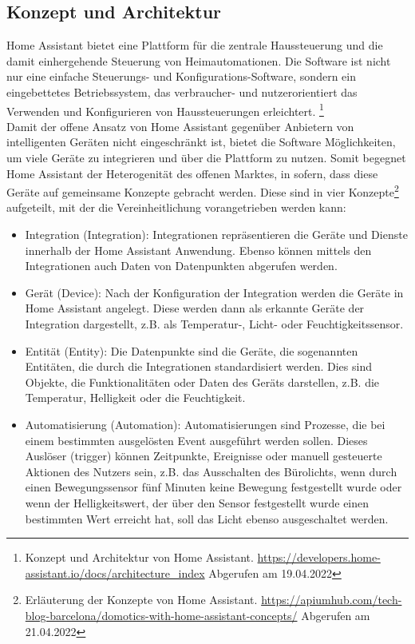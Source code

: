 \subsection{Konzept und Architektur}
\label{sec:conceptArchitectureHAOS}
    Home Assistant bietet eine Plattform für die zentrale Haussteuerung und die damit einhergehende Steuerung von Heimautomationen. Die 
    Software ist nicht nur eine einfache Steuerungs- und Konfigurations-Software, sondern ein eingebettetes Betriebssystem, das 
    verbraucher- und nutzerorientiert das Verwenden und Konfigurieren von Haussteuerungen erleichtert. \footnote{Konzept und Architektur von Home Assistant. \url{https://developers.home-assistant.io/docs/architecture_index} Abgerufen am 19.04.2022}
    \\
    \linebreak
    Damit der offene Ansatz von Home Assistant gegenüber Anbietern von intelligenten Geräten nicht eingeschränkt ist, bietet die Software Möglichkeiten, um viele 
    Geräte zu integrieren und über die Plattform zu nutzen. Somit begegnet Home Assistant der Heterogenität des offenen Marktes, in sofern, dass diese Geräte auf  
    gemeinsame Konzepte gebracht werden. Diese sind in vier Konzepte\footnote{Erläuterung der Konzepte von Home Assistant. \url{https://apiumhub.com/tech-blog-barcelona/domotics-with-home-assistant-concepts/} Abgerufen am 21.04.2022} 
    aufgeteilt, mit der die Vereinheitlichung vorangetrieben werden kann: 
    \begin{itemize}
        \item Integration (Integration): Integrationen repräsentieren die Geräte und Dienste innerhalb der Home Assistant Anwendung. 
              Ebenso können mittels den Integrationen auch Daten von Datenpunkten abgerufen werden.
        \item Gerät (Device): Nach der Konfiguration der Integration werden die Geräte in Home Assistant angelegt. 
              Diese werden dann als erkannte Geräte der Integration dargestellt, z.B. als Temperatur-, Licht- oder Feuchtigkeitssensor.
        \item Entität (Entity): Die Datenpunkte sind die Geräte, die sogenannten Entitäten, die durch die Integrationen standardisiert werden. 
              Dies sind Objekte, die Funktionalitäten oder Daten des Geräts darstellen, z.B. die Temperatur, Helligkeit oder die Feuchtigkeit.
        \item Automatisierung (Automation): Automatisierungen sind Prozesse, die bei einem bestimmten ausgelösten Event ausgeführt werden 
              sollen. Dieses Auslöser (trigger) können Zeitpunkte, Ereignisse oder manuell gesteuerte Aktionen des Nutzers sein, z.B. das 
              Ausschalten des Bürolichts, wenn durch einen Bewegungssensor fünf Minuten keine Bewegung festgestellt wurde oder wenn der 
              Helligkeitswert, der über den Sensor festgestellt wurde einen bestimmten Wert erreicht hat, soll das Licht ebenso 
              ausgeschaltet werden.
    \end{itemize}

